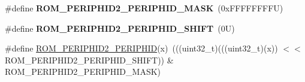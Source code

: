 \begin{DoxyCompactItemize}
\mbox{\label{group___m_t_b___register___masks_gac4fd9dca16b12b524b3f7be8cb5d0386}} 
\#define {\bfseries R\+O\+M\+\_\+\+P\+E\+R\+I\+P\+H\+I\+D2\+\_\+\+P\+E\+R\+I\+P\+H\+I\+D\+\_\+\+M\+A\+SK}~(0x\+F\+F\+F\+F\+F\+F\+F\+F\+U)
\item 
\mbox{\label{group___m_t_b___register___masks_ga3a0032b94f8d01378b20d260317d85d9}} 
\#define {\bfseries R\+O\+M\+\_\+\+P\+E\+R\+I\+P\+H\+I\+D2\+\_\+\+P\+E\+R\+I\+P\+H\+I\+D\+\_\+\+S\+H\+I\+FT}~(0\+U)
\item 
\#define \mbox{\hyperlink{group___m_t_b___register___masks_gac890c8c525b06c4792a9bc16569978e1}{R\+O\+M\+\_\+\+P\+E\+R\+I\+P\+H\+I\+D2\+\_\+\+P\+E\+R\+I\+P\+H\+ID}}(x)~(((uint32\+\_\+t)(((uint32\+\_\+t)(x)) $<$$<$ R\+O\+M\+\_\+\+P\+E\+R\+I\+P\+H\+I\+D2\+\_\+\+P\+E\+R\+I\+P\+H\+I\+D\+\_\+\+S\+H\+I\+FT)) \& R\+O\+M\+\_\+\+P\+E\+R\+I\+P\+H\+I\+D2\+\_\+\+P\+E\+R\+I\+P\+H\+I\+D\+\_\+\+M\+A\+SK)
\end{DoxyCompactItemize}
